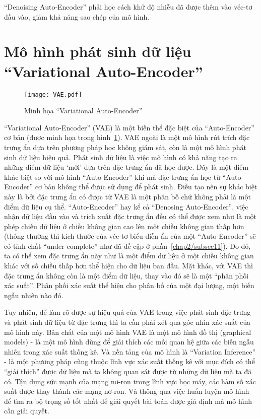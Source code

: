     ``Denoising Auto-Encoder'' phải học cách khử độ nhiễu đã được thêm vào véc-tơ đầu vào, giảm khả năng sao chép của mô hình.

\section{Mô hình phát sinh dữ liệu ``Variational Auto-Encoder''} \label{chap2/sec2}
        \begin{figure}
            \centering
            \texttt{[image: VAE.pdf]}
            \caption{Minh họa ``Variational Auto-Encoder''}
            \label{fig_VAE}
        \end{figure}
        ``Variational Auto-Encoder'' (VAE) là một biến thể đặc biệt của ``Auto-Encoder'' cơ bản (được minh họa trong hình~\ref{fig_VAE}). 
        VAE ngoài là một mô hình rút trích đặc trưng ẩn dựa trên phương pháp học không giám sát, còn là một mô hình phát sinh dữ liệu hiệu quả. 
        Phát sinh dữ liệu là việc mô hình có khả năng tạo ra những điểm dữ liệu `mới' dựa trên đặc trưng ẩn đã học được.
        Đây là một điểm khác biệt so với mô hình ``Auto-Encoder'' khi mà đặc trưng ẩn học từ ``Auto-Encoder'' cơ bản không thể được sử dụng để phát sinh. 
        Điều tạo nên sự khác biệt này là bởi đặc trưng ẩn có được từ VAE là một phân bố chứ không phải là một điểm dữ liệu cụ thể. 
        ``Auto-Encoder'' hay kể cả ``Denosing Auto-Encoder'', việc nhận dữ liệu đầu vào và trích xuất đặc trưng ẩn đều có thể được xem như là một phép chiếu dữ liệu ở chiều không gian cao lên một chiều không gian thấp hơn (thông thường thì kích thước của véc-tơ biểu diễn ẩn của một ``Auto-Encoder'' sẽ có tính chất ``under-complete'' như đã đề cập ở phần~\ref{chap2/subsec11}). 
        Do đó, ta có thể xem đặc trưng ẩn này như là một điểm dữ liệu ở một chiều không gian khác với số chiều thấp hơn thể hiện cho dữ liệu ban đầu. 
        Mặt khác, với VAE thì đặc trưng ẩn không còn là một điểm dữ liệu, thay vào đó sẽ là một ``phân phối xác suất''. 
        Phân phối xác suất thể hiện cho phân bố của một đại lượng, một biến ngẫu nhiên nào đó.
    
        Tuy nhiên, để làm rõ được sự hiệu quả của VAE trong việc phát sinh đặc trưng và phát sinh dữ liệu từ đặc trưng thì ta cần phải xét qua góc nhìn xác suất của mô hình này.
        Bản chất của một mô hình VAE là một mô hình đồ thị (graphical models) - là một mô hình dùng để giải thích các mối quan hệ giữa các biến ngẫu nhiên trong xác suất thống kê. Và nền tảng của mô hình là ``Variation Inference'' - là một phương pháp cũng thuộc lĩnh vực xác suất thống kê với mục đích có thể ``giải thích'' được dữ liệu mà ta không quan sát được từ những dữ liệu mà ta đã có. Tận dụng sức mạnh của mạng nơ-ron trong lĩnh vực học máy, các hàm số xác suất được thay thành các mạng nơ-ron. Và thông qua việc huấn luyện mô hình để tìm ra bộ trọng số tốt nhất để giải quyết bài toán được giả định mà mô hình cần giải quyết. 

